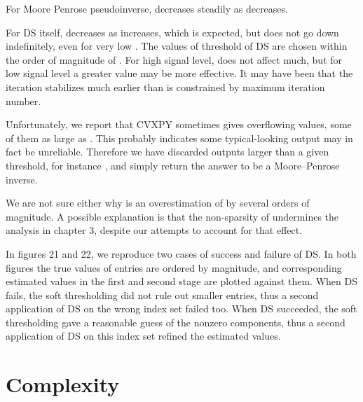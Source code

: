For Moore Penrose pseudoinverse, \m {\tilde {\chi}} decreases steadily as \m {\s} decreases.

For DS itself, \m {\tilde {\chi}} decreases as \m {\s} increases, which is expected, but \m {\tilde {\chi}} does not go down indefinitely, even for very low \m {\s}.
The values of threshold of DS  are chosen within the order of magnitude of \m {\s}.
For high signal level,  does not affect much, but for low signal level a greater value may be more effective.
It may have been that the iteration stabilizes much earlier than is constrained by maximum iteration number.

Unfortunately, we report that CVXPY sometimes gives overflowing values, some of them as large as .
This probably indicates some typical-looking output may in fact be unreliable.
Therefore we have discarded outputs larger than a given threshold, for instance , and simply return the answer to be a Moore–Penrose inverse.

We are not sure either why \m {\tilde {\chi}} is an overestimation of \m {\chi} by several orders of magnitude.
A possible explanation is that the non-sparsity of  undermines the analysis in chapter 3, despite our attempts to account for that effect.

In figures 21 and 22, we reproduce two cases of success and failure of DS.
In both figures the true values of  entries are ordered by magnitude, and corresponding estimated values in the first and second stage are plotted against them.
When DS fails, the soft thresholding did not rule out smaller entries, thus a second application of DS on the wrong index set failed too.
When DS succeeded, the soft thresholding gave a reasonable guess of the nonzero components, thus a second application of DS on this index set refined the estimated values.

\blank [big]
\blank [big]

\blank [big]
\blank [big]



\section {Complexity}

